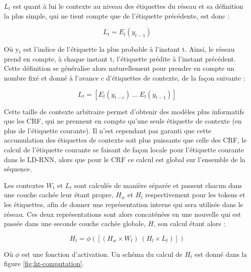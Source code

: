\documentclass[12pt,a4paper,times,twoside,openright]{report}
\begin{document}
$L_{t}$ est quant à lui le contexte au niveau des étiquettes du réseau et sa définition la plus simple, qui ne tient compte que de l'étiquette précédente, est donc :

\begin{equation}\label{eq:LD-RNN-minimal}
L_{t} = E_{l}(y_{t-1})
\end{equation}

Où y$_{t}$ est l'indice de l'étiquette la plus probable à l'instant t. Ainsi, le réseau prend en compte, à chaque instant t, l'étiquette prédite à l'instant précédent. Cette définition se généralise alors naturellement pour prendre en compte un nombre fixé et donné à l'avance $c$ d'étiquettes de contexte, de la façon suivante :

\begin{equation}\label{eq:LD-RNN-label-window}
L_{t} = \left[ E_{l}(y_{t-c})\ ...\ E_{l}(y_{t-1}) \right]
\end{equation}

Cette taille de contexte arbitraire permet d'obtenir des modèles plus informatifs que les CRF, qui ne prennent en compte qu'une seule étiquette de contexte (en plus de l'étiquette courante). Il n'est cependant pas garanti que cette accumulation des étiquettes de contexte soit plus puissante que celle des CRF, le calcul de l'étiquette courante se faisant de façon locale pour l'étiquette courante dans le LD-RNN, alors que pour le CRF ce calcul est global sur l'ensemble de la séquence.

Les contextes $W_{t}$ et $L_{t}$ sont calculés de manière séparée et passent chacun dans une couche cachée leur étant propre, $H_{w}$ et $H_{l}$ respectivement pour les tokens et les étiquettes, afin de donner une représentation interne qui sera utilisée dans le réseau. Ces deux représentations sont alors concaténées en une nouvelle qui est passée dans une seconde couche cachée globale, $H$, son calcul étant alors :

\begin{equation}\label{eq:LD-RNN-hidden}
H_{t} = \phi(\left[ (H_{w} \times W_{t})\ (H_{l} \times L_{t}) \right])
\end{equation}

Où $\phi$ est une fonction d'activation. Un schéma du calcul de $H_{t}$ est donné dans la figure \ref{fig:ht-computation}.
\end{document}
